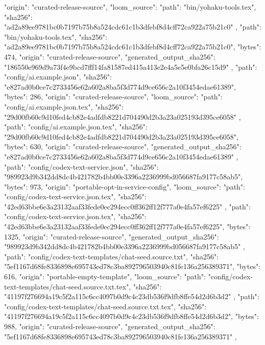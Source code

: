 {{      "origin": "curated-release-source",
      "loom_source": {
        "path": "bin/yohaku-tools.tex",
        "sha256": "ad2a89ee9781bc0b7197b75b8a524cdc61c1b3dfebf8d4cff72ca922a75b21c0"
      }
    },
    {
      "path": "bin/yohaku-tools.tex",
      "sha256": "ad2a89ee9781bc0b7197b75b8a524cdc61c1b3dfebf8d4cff72ca922a75b21c0",
      "bytes": 474,
      "origin": "curated-release-source",
      "generated_output_sha256": "186550e969d9a73f4e9bcd7fff14fa81587ed415a413e2e4a5e5e0bfa26c15d9"
    },
    {
      "path": "config/ai.example.json",
      "sha256": "e827ad0b0ce7c2733456e62a602a8ba5f3d774d9ce656c2a10f3454edae61389",
      "bytes": 286,
      "origin": "curated-release-source",
      "loom_source": {
        "path": "config/ai.example.json.tex",
        "sha256": "29d00fb60c9d10fed4cb82e4adfdb8221d704490d2b3a23a025193d395ce6058"
      }
    },
    {
      "path": "config/ai.example.json.tex",
      "sha256": "29d00fb60c9d10fed4cb82e4adfdb8221d704490d2b3a23a025193d395ce6058",
      "bytes": 630,
      "origin": "curated-release-source",
      "generated_output_sha256": "e827ad0b0ce7c2733456e62a602a8ba5f3d774d9ce656c2a10f3454edae61389"
    },
    {
      "path": "config/codex-text-service.json",
      "sha256": "989923d9b342dd8dc4b421782b4bb00e3396a2236999bd056687fa9177c58ab5",
      "bytes": 973,
      "origin": "portable-opt-in-service-config",
      "loom_source": {
        "path": "config/codex-text-service.json.tex",
        "sha256": "42ed63bbe6e3a23132aaf33fede0ec294ecc0ff362ff12f777a0e4fa57ef6225"
      }
    },
    {
      "path": "config/codex-text-service.json.tex",
      "sha256": "42ed63bbe6e3a23132aaf33fede0ec294ecc0ff362ff12f777a0e4fa57ef6225",
      "bytes": 1325,
      "origin": "curated-release-source",
      "generated_output_sha256": "989923d9b342dd8dc4b421782b4bb00e3396a2236999bd056687fa9177c58ab5"
    },
    {
      "path": "config/codex-text-templates/chat-seed.source.txt",
      "sha256": "5ef1167d68fe8336898e695743ed78c3ba892796503940c81fe136a256389371",
      "bytes": 616,
      "origin": "portable-empty-template",
      "loom_source": {
        "path": "config/codex-text-templates/chat-seed.source.txt.tex",
        "sha256": "41197f276694a19c5f2a115c6cc4097b0d9c4c23db536f9dfb8ffe54d2d6b3d2"
      }
    },
    {
      "path": "config/codex-text-templates/chat-seed.source.txt.tex",
      "sha256": "41197f276694a19c5f2a115c6cc4097b0d9c4c23db536f9dfb8ffe54d2d6b3d2",
      "bytes": 988,
      "origin": "curated-release-source",
      "generated_output_sha256": "5ef1167d68fe8336898e695743ed78c3ba892796503940c81fe136a256389371"
    },
}
